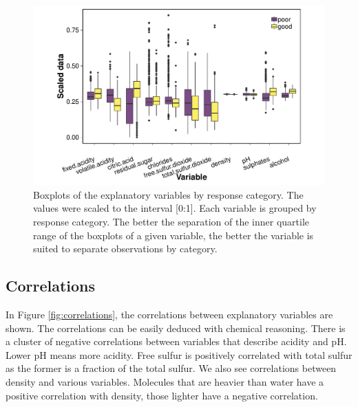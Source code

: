 \documentclass[11pt,]{article}
\begin{document}
\begin{figure}

{\centering \includegraphics[width=0.75\linewidth]{./figures/explanatory_boxplots-1} 

}

\caption{Boxplots of the explanatory variables by response category. The values were scaled to the interval [0:1]. Each variable is grouped by response category. The better the separation of the inner quartile range of the boxplots of a given variable, the better the variable is suited to separate observations by category.}\label{fig:explanatory_boxplots}
\end{figure}

\hypertarget{correlations}{%
\subsection{Correlations}\label{correlations}}

In Figure \ref{fig:correlations}, the correlations between explanatory
variables are shown. The correlations can be easily deduced with
chemical reasoning. There is a cluster of negative correlations between
variables that describe acidity and pH. Lower pH means more acidity.
Free sulfur is positively correlated with total sulfur as the former is
a fraction of the total sulfur. We also see correlations between density
and various variables. Molecules that are heavier than water have a
positive correlation with density, those lighter have a negative
correlation.
\end{document}
